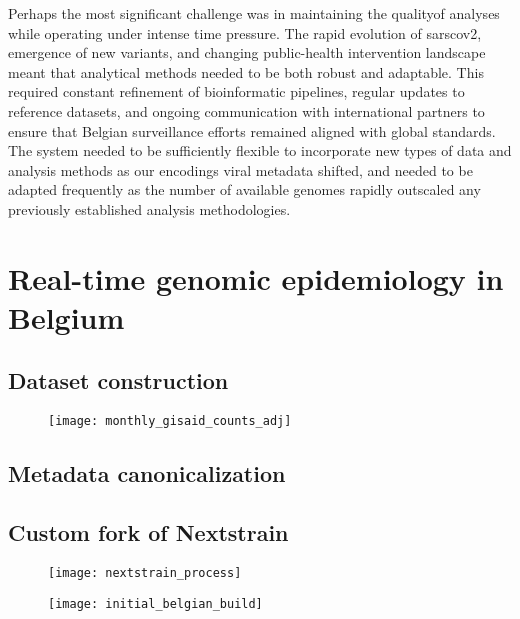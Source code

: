 Perhaps the most significant challenge was in maintaining the qualityof analyses while operating under intense time pressure.
The rapid evolution of \gls{sarscov2}, emergence of new variants, and changing public-health intervention landscape meant that analytical methods needed to be both robust and adaptable.
This required constant refinement of bioinformatic pipelines, regular updates to reference datasets, and ongoing communication with international partners to ensure that Belgian surveillance efforts remained aligned with global standards.
The system needed to be sufficiently flexible to incorporate new types of data and analysis methods as our encodings viral metadata shifted, and needed to be adapted frequently as the number of available genomes rapidly outscaled any previously established analysis methodologies.

\section{Real-time genomic epidemiology in Belgium}\label{sec:nextstrainBE}

\subsection{Dataset construction}

\begin{figure}[ht]
  \centering
  \texttt{[image: monthly\_gisaid\_counts\_adj]}
  \caption[Population-adjusted GISAID sequences]{}
  \label{fig:gisaidSeq}
\end{figure}

\subsection{Metadata canonicalization}

\subsection{Custom fork of Nextstrain}

\begin{figure}[ht]
  \centering
  \texttt{[image: nextstrain\_process]}
  \caption[Modified Nextstrain pipeline]{}
  \label{fig:beNxt}
\end{figure}

\begin{figure}[ht]
  \centering
  \texttt{[image: initial\_belgian\_build]}
  \caption[First Belgian Nextstrain instance]{}
  \label{fig:voiSI2}
\end{figure}

